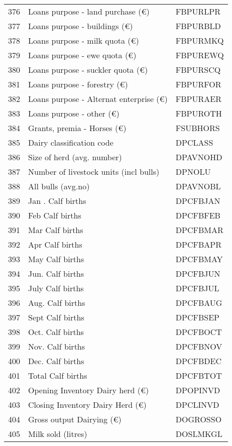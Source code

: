 \documentclass{article}\usepackage{graphicx, color}
\begin{document}
\begin{flushleft}
\begin{table}[ht]
\begin{center}
\begin{tabular}{rll}
  376 & Loans purpose - land purchase     (€) & FBPURLPR \\ 
  377 & Loans purpose - buildings     (€) & FBPURBLD \\ 
  378 & Loans purpose - milk quota    (€) & FBPURMKQ \\ 
  379 & Loans purpose - ewe quota     (€) & FBPUREWQ \\ 
  380 & Loans purpose - suckler quota (€) & FBPURSCQ \\ 
  381 & Loans purpose - forestry      (€) & FBPURFOR \\ 
  382 & Loans purpose - Alternat enterprise (€) & FBPURAER \\ 
  383 & Loans purpose - other         (€) & FBPUROTH \\ 
  384 & Grants, premia - Horses      (€) & FSUBHORS \\ 
  385 & Dairy classification code & DPCLASS \\ 
  386 & Size of herd  (avg. number) & DPAVNOHD \\ 
  387 & Number of livestock units (incl bulls) & DPNOLU \\ 
  388 & All bulls (avg.no) & DPAVNOBL \\ 
  389 & Jan .  Calf births & DPCFBJAN \\ 
  390 & Feb    Calf births & DPCFBFEB \\ 
  391 & Mar    Calf births & DPCFBMAR \\ 
  392 & Apr    Calf births & DPCFBAPR \\ 
  393 & May    Calf births & DPCFBMAY \\ 
  394 & Jun.   Calf births & DPCFBJUN \\ 
  395 & July   Calf births & DPCFBJUL \\ 
  396 & Aug.   Calf births & DPCFBAUG \\ 
  397 & Sept   Calf births & DPCFBSEP \\ 
  398 & Oct.   Calf births & DPCFBOCT \\ 
  399 & Nov.   Calf births & DPCFBNOV \\ 
  400 & Dec.   Calf births & DPCFBDEC \\ 
  401 & Total  Calf births & DPCFBTOT \\ 
  402 & Opening Inventory  Dairy herd (€) & DPOPINVD \\ 
  403 & Closing Inventory  Dairy Herd (€) & DPCLINVD \\ 
  404 & Gross output Dairying  (€) & DOGROSSO \\ 
  405 & Milk sold             (litres) & DOSLMKGL \\ 

\end{tabular}
\end{center}
\end{table}
\end{flushleft}
\end{document}
